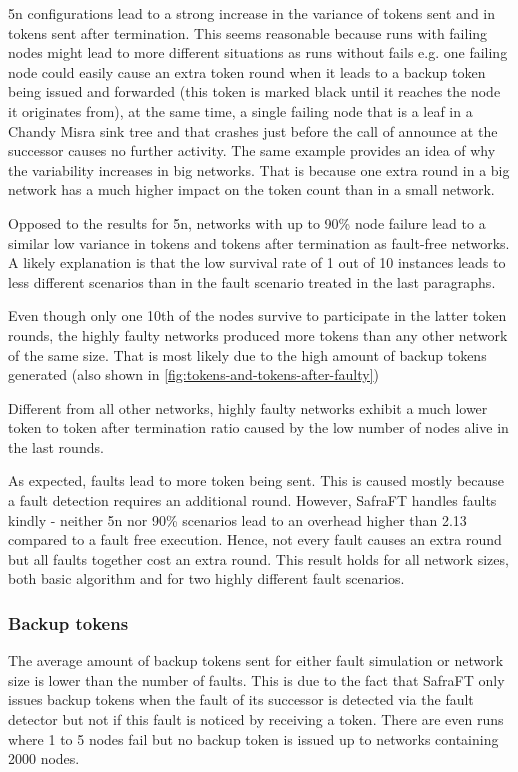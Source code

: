 5n configurations lead to a strong increase in the variance of tokens sent and in tokens sent after termination.
This seems reasonable because runs with failing nodes might lead to more different situations as runs without fails e.g. one failing node could easily cause an extra token round when it leads to a backup token being issued and forwarded (this token is marked black until it reaches the node it originates from), at the same time, a single failing node that is a leaf in a Chandy Misra sink tree and that crashes just before the call of announce at the successor  causes no further activity.
The same example provides an idea of why the variability increases in big networks. 
That is because one extra round in a big network has a much higher impact on the token count than in a small network.

Opposed to the results for 5n, networks with up to 90\% node failure lead to a similar low variance in tokens and tokens after termination as fault-free networks.
A likely explanation is that the low survival rate of 1 out of 10 instances leads to less different scenarios than in the fault scenario treated in the last paragraphs.

Even though only one 10th of the nodes survive to participate in the latter token rounds, the highly faulty networks produced more tokens than any other network of the same size.
That is most likely due to the high amount of backup tokens generated (also shown in \cref{fig:tokens-and-tokens-after-faulty})

Different from all other networks, highly faulty networks exhibit a much lower token to token after termination ratio caused by the low number of nodes alive in the last rounds.

As expected, faults lead to more token being sent.
This is caused mostly because a fault detection requires an additional round.
However, SafraFT handles faults kindly - neither 5n nor 90\% scenarios lead to an overhead higher than 2.13 compared to a fault free execution.
Hence, not every fault causes an extra round but all faults together cost an extra round.
This result holds for all network sizes, both basic algorithm and for two highly different fault scenarios.

\subsubsection{Backup tokens}
The average amount of backup tokens sent for either fault simulation or network size is lower than the number of faults.
This is due to the fact that SafraFT only issues backup tokens when the fault of its successor is detected via the fault detector but not if this fault is noticed by receiving a token.
There are even runs where 1 to 5 nodes fail but no backup token is issued up to networks containing 2000 nodes. 

